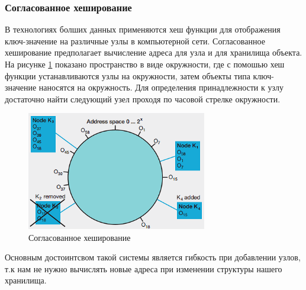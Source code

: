 \documentclass{article}
\begin{document}
\subsubsection{Согласованное хеширование}
В технологиях болших данных применяются хеш функции для отображения ключ-значение на различные узлы в компьютерной сети. Согласованное хеширование предполагает вычисление адреса для узла и для хранилища объекта.\\
На рисунке \ref{img3} показано пространство в виде окружности, где с помошью хеш функции устанавливаются узлы на окружности, затем объекты типа ключ-значение наносятся на окружность.
Для определения принадлежности к узлу достаточно найти следующий узел проходя по часовой стрелке окружности. 
\begin{figure}[h]
    \centering
    \includegraphics[width=0.7\textwidth]{images/consistent_hash.png}
    \caption{Согласованное хеширование}
    \label{img3}
\end{figure}
\newpage
Основным достоинтсвом такой системы является гибкость при добавлении узлов, т.к нам не нужно вычислять новые адреса при изменении структуры нашего хранилища.
\end{document}
